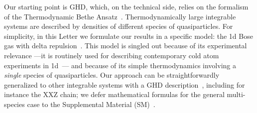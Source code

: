 \documentclass[twocolumn,amsfonts,showpacs,superscriptaddress]{revtex4-1}
\begin{document}
Our starting point is GHD, which, on the technical side, relies on the formalism of the Thermodynamic Bethe Ansatz~\cite{yang1969thermodynamics,takahashi2005thermodynamics}. Thermodynamically large integrable systems are described by densities of different species of quasiparticles. For simplicity,
in this Letter we formulate our results in a specific model: the 1d Bose gas with delta repulsion~\cite{lieb1963exact,berezin1964schrodinger,korepin1997quantum}. This model is singled out because of its experimental relevance ---it is routinely used for describing contemporary cold atom experiments in 1d~\cite{olshanii1998atomic,van2008yang,vogler2013thermodynamics,schemmer2019generalized,wilson2019observation}--- and because of its simple thermodynamics involving a {\it single} species of quasiparticles. Our approach can be straightforwardly generalized to other integrable systems with a GHD description~\cite{piroli2017transport,ilievski2017microscopic,ilievski2017ballistic,doyon2017large,doyon2017drude,bulchandani2018bethe,collura2018analytic,doyon2018soliton,cao2018incomplete,doyon2018exact,bastianello2018generalized,de2018hydrodynamic,10.21468/SciPostPhys.6.4.049,gopalakrishnan2018hydrodynamics,mazza2018energy,vu2018equations,borsi2019current,doyon2019generalised,bulchandani2019kinetic,spohn2019generalized,bastianello2019generalized,panfil2019linearized,alba2019towards,agrawal2019generalized,cubero2019generalized,bertini2019GHD,mestyan2019GHD,bertini2018GHD,bertini2019GHDb,mestyan2019GHDb}, including for instance the XXZ chain; we defer mathematical formulas for the general multi-species case to the Supplemental Material (SM)~\cite{SM}.
\end{document}
